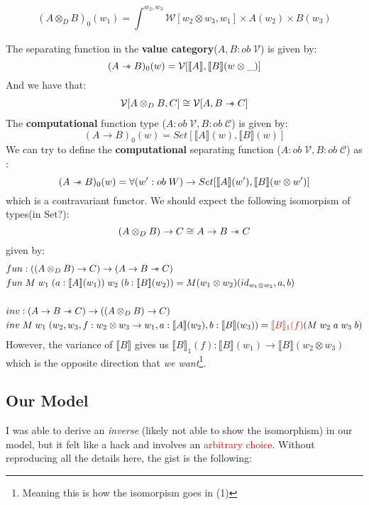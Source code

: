 \documentclass{article}
\newcommand{\den}[1]{\llbracket #1 \rrbracket}
\newcommand{\sep}{\mathrel{-\mkern-6mu*}}
\newcommand{\red}[1]{\textcolor{red}{#1}}
\begin{document}
\[
    (A \otimes_D B)_0(w_1) = \int_{}^{w_2,w_3} \mathcal{W}[ w_2 \otimes w_3 , w_1 ] 
    \times A(w_2) \times B(w_3)
\]

The separating function in the \textbf{value category}($A , B : ob \;\mathcal{V}$) is given by:
\[
    (A \sep B)_0(w) = \mathcal{V}[ \den{A} , \den{B}(w \otimes \_)]
\]
And we have that:
\begin{align}
    \mathcal{V} [ A \otimes_D B , C] \cong \mathcal{V} [ A , B \sep C]
\end{align}
The \textbf{computational} function type ($A : ob \;\mathcal{V} , B : ob \;\mathcal{C}$) is given by:
\[ 
    (A \rightarrow B)_0(w) = Set[ \den{A}(w) , \den{B}(w)]
\]
We can try to define the \textbf{computational} separating function ($A : ob \;\mathcal{V} , B : ob \;\mathcal{C}$) as :
\[
    (A \sep B)_0(w) = \forall(w' : ob \; W) \rightarrow Set[ \den{A}(w'), \den{B}(w \otimes w')] 
\]
which is a contravariant functor. We should expect the following isomorpism of types(in Set?):
\[
    (A \otimes_D B) \rightarrow C \cong A \rightarrow B \sep C  
\]
given by:
\begin{align*}
    &fun : ((A \otimes_D B) \rightarrow C) \rightarrow (A \rightarrow B \sep C )\\
    &fun \; M \; w_1 \;(a : \den{A}(w_1)) \; w_2 \;(b : \den{B}(w_2)) = M (w_1 \otimes w_2)(id_{w_1 \otimes w_2} , a , b)\\
    \\
    &inv :(A \rightarrow B \sep C ) \rightarrow ((A \otimes_D B) \rightarrow C)\\
    &inv \; M \; w_1 \; (w_2,w_3,f : w_2 \otimes w_3 \rightarrow w_1, a : \den{A}(w_2), b : \den{B}(w_3)) = \red{\den{B}_1(f)}(M \; w_2 \; a \; w_3 \; b)
\end{align*}
However, the variance of $\den{B}$ gives us $\den{B}_1(f) : \den{B}(w_1) \rightarrow \den{B}(w_2 \otimes w_3)$ 
which is the opposite direction that \textit{we want}\footnote{Meaning this is how the isomorpism goes in (1)}.
\subsection{Our Model}
I was able to derive an \textit{inverse} (likely not able to show the isomorphism) in our model, 
but it felt like a hack and involves an \red{arbitrary choice}. Without reproducing all the details here, 
the gist is the following:
\end{document}
